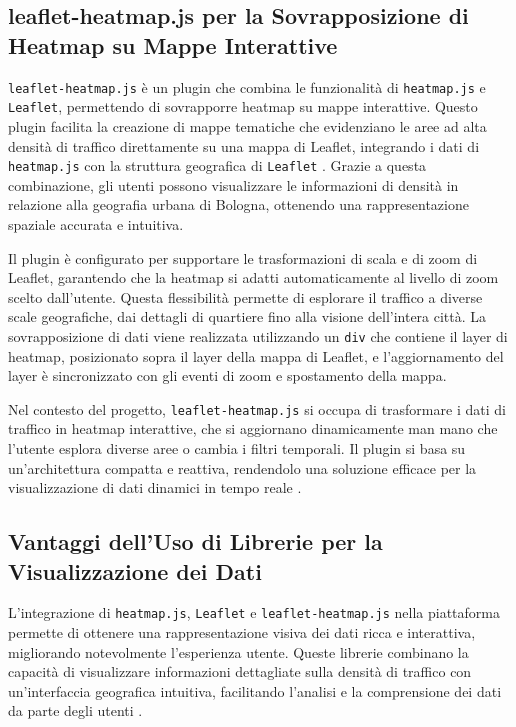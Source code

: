 \subsection{leaflet-heatmap.js per la Sovrapposizione di Heatmap su Mappe Interattive}
\texttt{leaflet-heatmap.js} è un plugin che combina le funzionalità di \texttt{heatmap.js} e \texttt{Leaflet}, permettendo di sovrapporre heatmap su mappe interattive. Questo plugin facilita la creazione di mappe tematiche che evidenziano le aree ad alta densità di traffico direttamente su una mappa di Leaflet, integrando i dati di \texttt{heatmap.js} con la struttura geografica di \texttt{Leaflet} \cite{leaflet_heatmap_docs}. Grazie a questa combinazione, gli utenti possono visualizzare le informazioni di densità in relazione alla geografia urbana di Bologna, ottenendo una rappresentazione spaziale accurata e intuitiva.

Il plugin è configurato per supportare le trasformazioni di scala e di zoom di Leaflet, garantendo che la heatmap si adatti automaticamente al livello di zoom scelto dall’utente. Questa flessibilità permette di esplorare il traffico a diverse scale geografiche, dai dettagli di quartiere fino alla visione dell’intera città. La sovrapposizione di dati viene realizzata utilizzando un \texttt{div} che contiene il layer di heatmap, posizionato sopra il layer della mappa di Leaflet, e l’aggiornamento del layer è sincronizzato con gli eventi di zoom e spostamento della mappa.

Nel contesto del progetto, \texttt{leaflet-heatmap.js} si occupa di trasformare i dati di traffico in heatmap interattive, che si aggiornano dinamicamente man mano che l’utente esplora diverse aree o cambia i filtri temporali. Il plugin si basa su un’architettura compatta e reattiva, rendendolo una soluzione efficace per la visualizzazione di dati dinamici in tempo reale \cite{bostock2012d3}.

\subsection{Vantaggi dell’Uso di Librerie per la Visualizzazione dei Dati}
L’integrazione di \texttt{heatmap.js}, \texttt{Leaflet} e \texttt{leaflet-heatmap.js} nella piattaforma permette di ottenere una rappresentazione visiva dei dati ricca e interattiva, migliorando notevolmente l'esperienza utente. Queste librerie combinano la capacità di visualizzare informazioni dettagliate sulla densità di traffico con un’interfaccia geografica intuitiva, facilitando l’analisi e la comprensione dei dati da parte degli utenti \cite{heer2012interactive}.

